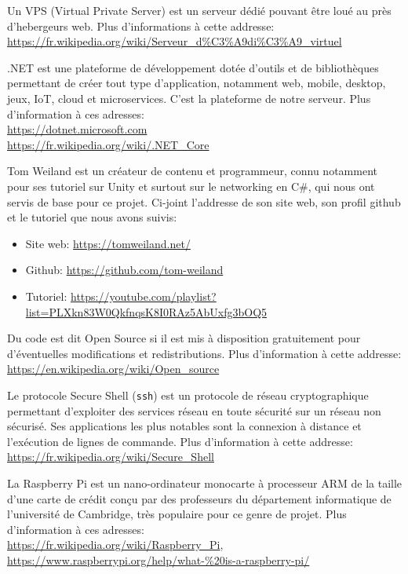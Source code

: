 \documentclass[a4paper]{article}
\begin{document}
\newpage
\begin{thebibliography}{}
	Un VPS (Virtual Private Server) est un serveur dédié pouvant être loué au près d'hebergeurs web. Plus d'informations à cette addresse: \\
    \url{https://fr.wikipedia.org/wiki/Serveur_d\%C3\%A9di\%C3\%A9_virtuel}

	.NET est une plateforme de développement dotée d'outils et de bibliothèques permettant de créer tout type d'application, notamment web, mobile, desktop, jeux, IoT, cloud et microservices. C'est la plateforme de notre serveur. Plus d'information à ces adresses: \\ 
    \url{https://dotnet.microsoft.com} \\
    \url{https://fr.wikipedia.org/wiki/.NET_Core}

	Tom Weiland est un créateur de contenu et programmeur, connu notamment pour ses tutoriel sur Unity et surtout sur le networking en C\#, qui nous ont servis de base pour ce projet. Ci-joint l'addresse de son site web, son profil github et le tutoriel que nous avons suivis:
    \begin{itemize}
    	\item Site web: \url{https://tomweiland.net/}
        \item Github: \url{https://github.com/tom-weiland}
        \item Tutoriel: \url{https://youtube.com/playlist?list=PLXkn83W0QkfnqsK8I0RAz5AbUxfg3bOQ5}
    \end{itemize}

	Du code est dit Open Source si il est mis à disposition gratuitement pour d'éventuelles modifications et redistributions. Plus d'information à cette addresse: \\ 
    \url{https://en.wikipedia.org/wiki/Open_source}

	Le protocole Secure Shell (\texttt{ssh}) est un protocole de réseau cryptographique permettant d'exploiter des services réseau en toute sécurité sur un réseau non sécurisé. Ses applications les plus notables sont la connexion à distance et l'exécution de lignes de commande. Plus d'information à cette addresse: \\
    \url{https://fr.wikipedia.org/wiki/Secure_Shell}
    
	La Raspberry Pi est un nano-ordinateur monocarte à processeur ARM de la taille d'une carte de crédit conçu par des professeurs du 	  département informatique de l'université de Cambridge, très populaire pour ce genre de projet.
    Plus d'information à ces adresses: \\ 
    \url{https://fr.wikipedia.org/wiki/Raspberry_Pi}, \\
    \url{https://www.raspberrypi.org/help/what-\%20is-a-raspberry-pi/}
    

\end{thebibliography}
\end{document}
